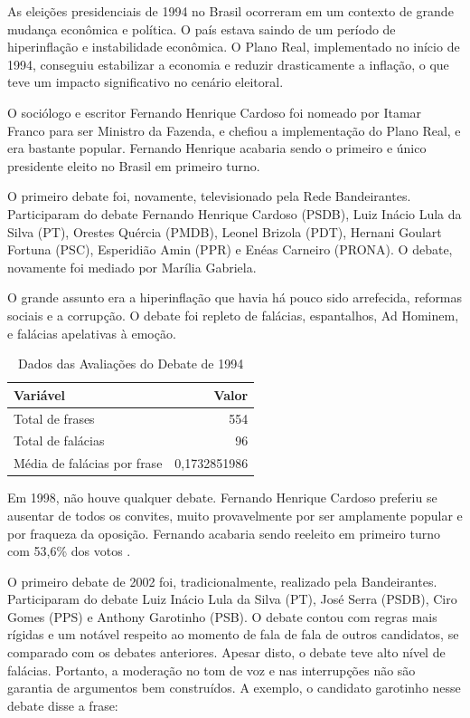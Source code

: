 \documentclass[12pt]{article}
\begin{document}
As eleições presidenciais de 1994 no Brasil ocorreram em um contexto de grande mudança econômica e política. O país estava saindo de um período de hiperinflação e instabilidade econômica. O Plano Real, implementado no início de 1994, conseguiu estabilizar a economia e reduzir drasticamente a inflação, o que teve um impacto significativo no cenário eleitoral.

O sociólogo e escritor Fernando Henrique Cardoso foi nomeado por Itamar Franco para ser Ministro da Fazenda, e chefiou a implementação do Plano Real, e era bastante popular. Fernando Henrique acabaria sendo o primeiro e único presidente eleito no Brasil em primeiro turno.

O primeiro debate foi, novamente, televisionado pela Rede Bandeirantes. Participaram do debate Fernando Henrique Cardoso (PSDB), Luiz Inácio Lula da Silva (PT), Orestes Quércia (PMDB), Leonel Brizola (PDT), Hernani Goulart Fortuna (PSC), Esperidião Amin (PPR) e Enéas Carneiro (PRONA). O debate, novamente foi mediado por Marília Gabriela. 

O grande assunto era a hiperinflação que havia há pouco sido arrefecida, reformas sociais e a corrupção. O debate foi repleto de falácias, espantalhos, Ad Hominem, e falácias apelativas à emoção. 

\begin{table}[ht]
\centering
\caption{Dados das Avaliações do Debate de 1994}
\label{tab:exTable1}
\begin{tabular}{l r}
\hline
\textbf{Variável} & \textbf{Valor} \\
\hline
Total de frases & 554 \\
Total de falácias & 96 \\
Média de falácias por frase & 0,1732851986 \\
\hline
\end{tabular}
\end{table}

Em 1998, não houve qualquer debate. Fernando Henrique Cardoso preferiu se ausentar de todos os convites, muito provavelmente por ser amplamente popular e por fraqueza da oposição. Fernando acabaria sendo reeleito em primeiro turno com 53,6\% dos votos \cite{MemoriaGlobo-8}.

O primeiro debate de 2002 foi, tradicionalmente, realizado pela Bandeirantes. Participaram do debate Luiz Inácio Lula da Silva (PT), José Serra (PSDB), Ciro Gomes (PPS) e Anthony Garotinho (PSB). O debate contou com regras mais rígidas e um notável respeito ao momento de fala de fala de outros candidatos, se comparado com os debates anteriores. Apesar disto, o debate teve alto nível de falácias. Portanto, a moderação no tom de voz e nas interrupções não são garantia de argumentos bem construídos. A exemplo, o candidato garotinho nesse debate disse a frase:
\end{document}
